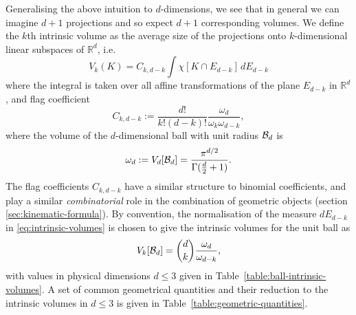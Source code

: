 Generalising the above intuition to $d$-dimensions, we see that in general we can imagine $d+1$ projections and so expect $d+1$ corresponding volumes.
We define the $k$th intrinsic volume as the average size of the projections onto $k$-dimensional linear subspaces of $\mathbb{R}^d$, i.e.\ \cite{Klain1997,Santalo2004}
\begin{equation}\label{eq:intrinsic-volumes}
  V_k(K)
  =
  C_{k,d-k}
  \int \chi[K \cap E_{d-k}] \, dE_{d-k}
\end{equation}
where the integral is taken over all affine transformations of the plane $E_{d-k}$ in $\mathbb{R}^d$, and flag coefficient
\begin{equation}\label{eq:flag-coefficients}
  C_{k,d-k}
  :=
  \frac{d!}{k! (d-k)!} \frac{\omega_d}{\omega_k \omega_{d-k}},
\end{equation}
where the volume of the $d$-dimensional ball with unit radius $\mathcal{B}_d$ is
\begin{equation}
  \omega_d := V_d[\mathcal{B}_d] = \frac{\pi^{d/2}}{\Gamma(\frac{d}{2} + 1)}.
\end{equation}
The flag coefficients $C_{k,d-k}$ have a similar structure to binomial coefficients, and play a similar \emph{combinatorial} role in the combination of geometric objects (section \ref{sec:kinematic-formula}).
By convention, the normalisation of the measure $dE_{d-k}$ in \eqref{eq:intrinsic-volumes} is chosen to give the intrinsic volumes for the unit ball as
\begin{equation}\label{eq:intrinsic-volume-ball}
  V_k [\mathcal{B}_d]
  =
  {d \choose k} \frac{\omega_d}{\omega_{d-k}},
\end{equation}
with values in physical dimensions $d \le 3$ given in Table~\ref{table:ball-intrinsic-volumes}.
A set of common geometrical quantities and their reduction to the intrinsic volumes in $d \le 3$ is given in Table~\ref{table:geometric-quantities}.

